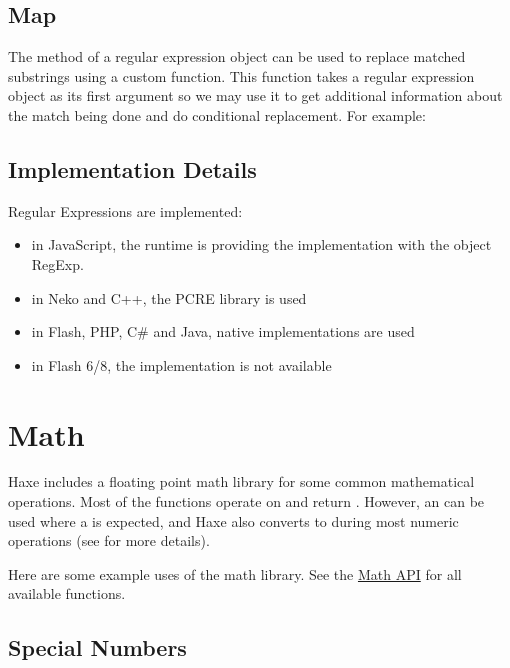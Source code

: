 
\subsection{Map}
\label{std-regex-map}

The  method of a regular expression object can be used to replace matched substrings using a custom function. This function takes a regular expression object as its first argument so we may use it to get additional information about the match being done and do conditional replacement. For example:



\subsection{Implementation Details}
\label{std-regex-implementation-details}

Regular Expressions are implemented:

\begin{itemize}
	\item in JavaScript, the runtime is providing the implementation with the object RegExp.
	\item in Neko and C++, the PCRE library is used
	\item in Flash, PHP, C\# and Java, native implementations are used
	\item in Flash 6/8, the implementation is not available
\end{itemize}


\section{Math}
\label{std-math}

Haxe includes a floating point math library for some common mathematical operations. Most of the functions operate on and return . However, an  can be used where a  is expected, and Haxe also converts  to  during most numeric operations  (see  for more details).

Here are some example uses of the math library.  See the \href{http://api.haxe.org/Math.html}{Math API} for all available functions.


\subsection{Special Numbers}
\label{std-math-special-numbers}

